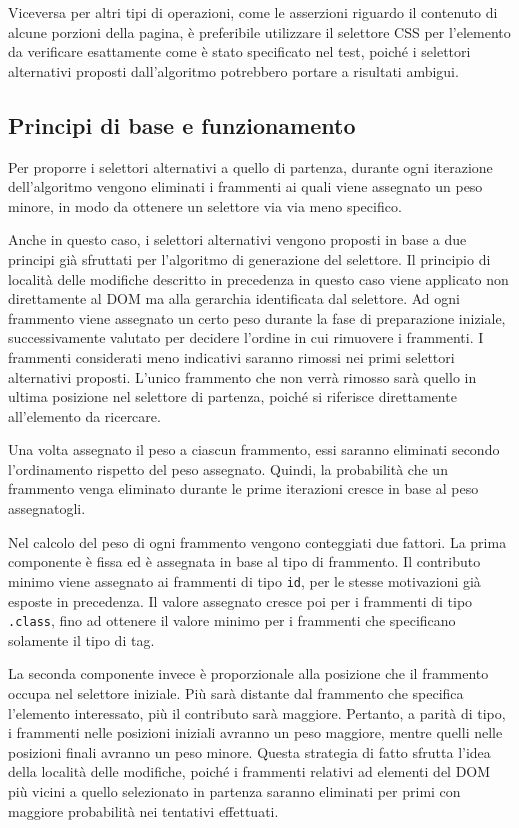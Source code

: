 Viceversa per altri tipi di operazioni, come le asserzioni riguardo il contenuto di alcune porzioni della pagina, è preferibile utilizzare il selettore CSS per l'elemento da verificare esattamente come è stato specificato nel test, poiché i selettori alternativi proposti dall'algoritmo potrebbero portare a risultati ambigui.

\subsection{Principi di base e funzionamento}

Per proporre i selettori alternativi a quello di partenza, durante ogni iterazione dell'algoritmo vengono eliminati i frammenti ai quali viene assegnato un peso minore, in modo da ottenere un selettore via via meno specifico. 

Anche in questo caso, i selettori alternativi vengono proposti in base a due principi già sfruttati per l'algoritmo di generazione del selettore. Il principio di località delle modifiche descritto in precedenza in questo caso viene applicato non direttamente al DOM ma alla gerarchia identificata dal selettore. Ad ogni frammento viene assegnato un certo peso durante la fase di preparazione iniziale, successivamente valutato per decidere l'ordine in cui rimuovere i frammenti. I frammenti considerati meno indicativi saranno rimossi nei primi selettori alternativi proposti. L'unico frammento che non verrà rimosso sarà quello in ultima posizione nel selettore di partenza, poiché si riferisce direttamente all'elemento da ricercare. 

Una volta assegnato il peso a ciascun frammento, essi saranno eliminati secondo l'ordinamento rispetto del peso assegnato. Quindi, la probabilità che un frammento venga eliminato durante le prime iterazioni cresce in base al peso assegnatogli.

Nel calcolo del peso di ogni frammento vengono conteggiati due fattori. La prima componente è fissa ed è assegnata in base al tipo di frammento. Il contributo minimo viene assegnato ai frammenti di tipo \verb|id|, per le stesse motivazioni già esposte in precedenza. Il valore assegnato cresce poi per i frammenti di tipo \verb|.class|, fino ad ottenere il valore minimo per i frammenti che specificano solamente il tipo di tag.

La seconda componente invece è proporzionale alla posizione che il frammento occupa nel selettore iniziale. Più sarà distante dal frammento che specifica l'elemento interessato, più il contributo sarà maggiore. Pertanto, a parità di tipo, i frammenti nelle posizioni iniziali avranno un peso maggiore, mentre quelli nelle posizioni finali avranno un peso minore. Questa strategia di fatto sfrutta l'idea della località delle modifiche, poiché i frammenti relativi ad elementi del DOM più vicini a quello selezionato in partenza saranno eliminati per primi con maggiore probabilità nei tentativi effettuati.

